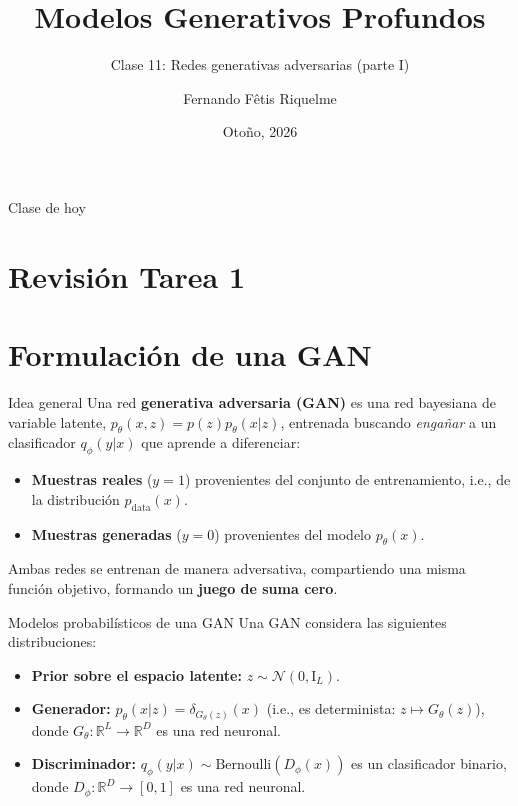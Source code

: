 \documentclass{beamer}
\title{Modelos Generativos Profundos}
\subtitle{Clase 11: Redes generativas adversarias (parte I)}
\author{Fernando Fêtis Riquelme}
\institute{
    Facultad de Ciencias Físicas y Matemáticas\\
    Universidad de Chile
}
\date{Otoño, 2026}
\newcommand{\R}{\mathbb{R}}
\begin{document}
\begin{frame}
    \titlepage
\end{frame}

\begin{frame}{Clase de hoy}
    \tableofcontents
\end{frame}

\section{Revisión Tarea 1}

\section{Formulación de una GAN}

\begin{frame}{Idea general}
    Una red \textbf{generativa adversaria (GAN)} es una red bayesiana de variable latente, $p_\theta(x,z)=p(z)p_\theta(x|z)$, entrenada buscando \textit{engañar} a un clasificador $q_\phi(y|x)$ que aprende a diferenciar:
    \begin{itemize}
        \item \textbf{Muestras reales} ($y=1$) provenientes del conjunto de entrenamiento, i.e., de la distribución $p_\text{data}(x)$.
        \item \textbf{Muestras generadas} ($y=0$) provenientes del modelo $p_\theta(x)$.
    \end{itemize}
    Ambas redes se entrenan de manera adversativa, compartiendo una misma función objetivo, formando un \textbf{juego de suma cero}.
\end{frame}

\begin{frame}{Modelos probabilísticos de una GAN}
    Una GAN considera las siguientes distribuciones:
    \begin{itemize}
        \item \textbf{Prior sobre el espacio latente:} $z\sim\mathcal{N}(0,\text{I}_L)$.
        \item \textbf{Generador:} $p_\theta(x|z)=\delta_{G_\theta(z)}(x)$ (i.e., es determinista: $z\mapsto G_\theta(z)$), donde $G_\theta:\R^L\to\R^D$ es una red neuronal.
        \item \textbf{Discriminador:} $q_\phi(y| x)\sim\text{Bernoulli}(D_\phi(x))$ es un clasificador binario, donde $D_\phi:\R^D\to[0,1]$ es una red neuronal.
    \end{itemize}
\end{frame}
\end{document}
